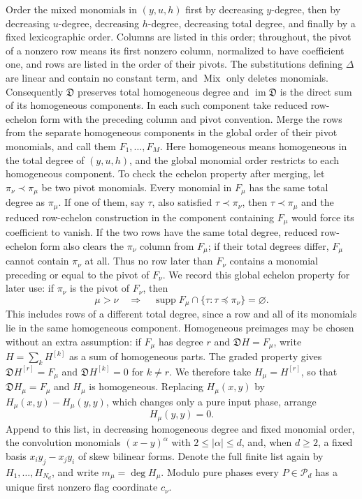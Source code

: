 \documentclass[11pt]{article}
\numberwithin{equation}{section}
\theoremstyle{remark}
\theoremstyle{definition}
\newcommand{\Mix}{\operatorname{Mix}}
\newcommand{\Dop}{\mathfrak D}
\begin{document}
Order the mixed monomials in $(y,u,h)$ first by decreasing $y$-degree,
then by decreasing $u$-degree, decreasing $h$-degree, decreasing total
degree, and finally by a fixed lexicographic order.  Columns are listed in
this order; throughout, the pivot of a nonzero row means its first nonzero
column, normalized to have coefficient one, and rows are listed in the
order of their pivots.  The substitutions defining $\Delta$ are linear and
contain no constant term, and $\Mix$ only deletes monomials.  Consequently
$\Dop$ preserves total homogeneous degree and
$\operatorname{im}\Dop$ is the direct sum of its homogeneous components.
In each such component take reduced row-echelon form with the preceding
column and pivot convention.
Merge the rows from the separate homogeneous components in the global
order of their pivot monomials, and call them $F_1,\ldots,F_M$.
Here homogeneous means homogeneous in the total degree of $(y,u,h)$, and
the global monomial order restricts to each homogeneous component.  To
check the echelon property after merging, let
$\pi_\nu\prec\pi_\mu$ be two pivot monomials.  Every monomial in $F_\mu$
has the same total degree as $\pi_\mu$.  If one of them, say $\tau$, also
satisfied $\tau\prec\pi_\nu$, then $\tau\prec\pi_\mu$ and the reduced
row-echelon construction in the component containing $F_\mu$ would force
its coefficient to vanish.  If the two rows have the same total degree,
reduced row-echelon form also clears the $\pi_\nu$ column from $F_\mu$;
if their total degrees differ, $F_\mu$ cannot contain $\pi_\nu$ at all.
Thus no row later than $F_\nu$ contains a monomial preceding or equal to
the pivot of $F_\nu$.  We record this global echelon property for later
use: if $\pi_\nu$ is the pivot of $F_\nu$, then
\begin{equation}\label{eq:global-echelon-property}
 \mu>\nu
 \quad\Longrightarrow\quad
 \operatorname{supp}F_\mu
 \cap\{\tau:\tau\preceq\pi_\nu\}=\varnothing.
\end{equation}
This includes rows of a different total degree, since a row and all of
its monomials lie in the same homogeneous component.  Homogeneous preimages
may be chosen without an extra assumption: if $F_\mu$ has degree $r$ and
$\Dop H=F_\mu$, write $H=\sum_kH^{[k]}$ as a sum of homogeneous parts.
The graded property gives $\Dop H^{[r]}=F_\mu$ and
$\Dop H^{[k]}=0$ for $k\ne r$.  We therefore take
$H_\mu=H^{[r]}$, so that $\Dop H_\mu=F_\mu$ and $H_\mu$ is homogeneous.
Replacing $H_\mu(x,y)$ by
$H_\mu(x,y)-H_\mu(y,y)$, which changes only a pure input phase, arrange
\begin{equation}\label{eq:Hdiag}
 H_\mu(y,y)=0.
\end{equation}
Append to this list, in decreasing homogeneous degree and fixed monomial
order, the convolution monomials $(x-y)^\alpha$ with
$2\le|\alpha|\le d$, and, when $d\ge2$, a fixed basis
$x_i y_j-x_jy_i$ of skew bilinear forms.  Denote the
full finite list again by $H_1,\ldots,H_{N_d}$, and write
$m_\mu=\deg H_\mu$.
Modulo pure phases every $P\in\mathcal P_d$ has a unique first nonzero flag
coordinate $c_\nu$.
\end{document}

